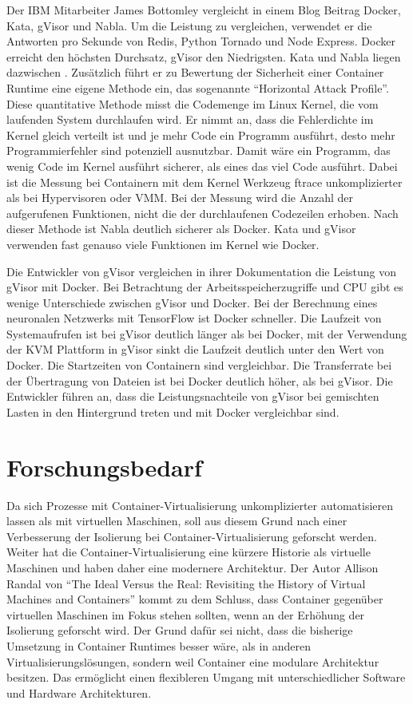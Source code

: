 Der IBM Mitarbeiter James Bottomley vergleicht in einem Blog Beitrag Docker, Kata, gVisor und Nabla. Um die Leistung zu vergleichen, verwendet er die Antworten pro Sekunde von Redis, Python Tornado und Node Express. Docker erreicht den höchsten Durchsatz, gVisor den Niedrigsten. Kata und Nabla liegen dazwischen \cite[vgl.][]{JamesBottomley.14.07.2018}.
Zusätzlich führt er zu Bewertung der Sicherheit einer Container Runtime eine eigene Methode ein, das sogenannte "`Horizontal Attack Profile"'. Diese quantitative Methode misst die Codemenge im Linux Kernel, die vom laufenden System durchlaufen wird. Er nimmt an, dass die Fehlerdichte im Kernel gleich verteilt ist und je mehr Code ein Programm ausführt, desto mehr Programmierfehler sind potenziell ausnutzbar. Damit wäre ein Programm, das wenig Code im Kernel ausführt sicherer, als eines das viel Code ausführt. Dabei ist die Messung bei Containern mit dem Kernel Werkzeug ftrace unkomplizierter als bei Hypervisoren oder \ac{VMM}. Bei der Messung wird die Anzahl der aufgerufenen Funktionen, nicht die der durchlaufenen Codezeilen erhoben.
Nach dieser Methode ist Nabla deutlich sicherer als Docker. Kata und gVisor verwenden fast genauso viele Funktionen im Kernel wie Docker. \cite[vgl.][]{JamesBottomley.14.07.2018, Luksa.2018}

Die Entwickler von gVisor vergleichen in ihrer Dokumentation die Leistung von gVisor mit Docker. Bei Betrachtung der Arbeitsspeicherzugriffe und CPU gibt es wenige Unterschiede zwischen gVisor und Docker. Bei der Berechnung eines neuronalen Netzwerks mit TensorFlow ist Docker schneller. Die Laufzeit von Systemaufrufen ist bei gVisor deutlich länger als bei Docker, mit der Verwendung der \ac{KVM} Plattform in gVisor sinkt die Laufzeit deutlich unter den Wert von Docker. Die Startzeiten von Containern sind vergleichbar. Die Transferrate bei der Übertragung von Dateien ist bei Docker deutlich höher, als bei gVisor. Die Entwickler führen an, dass die Leistungsnachteile von gVisor bei gemischten Lasten in den Hintergrund treten und mit Docker vergleichbar sind. \cite[vgl.][]{gVisor.20200122b}

\section{Forschungsbedarf}

Da sich Prozesse mit Container-Virtualisierung unkomplizierter automatisieren lassen als mit virtuellen Maschinen, soll aus diesem Grund nach einer Verbesserung der Isolierung bei Container-Virtualisierung geforscht werden. Weiter hat die Container-Virtualisierung eine kürzere Historie als virtuelle Maschinen und haben daher eine modernere Architektur. Der Autor Allison Randal von "`The Ideal Versus the Real: Revisiting the History of Virtual Machines  and Containers"' kommt zu dem Schluss, dass Container gegenüber virtuellen Maschinen im Fokus stehen sollten, wenn an der Erhöhung der Isolierung geforscht wird. Der Grund dafür sei nicht, dass die bisherige Umsetzung in Container Runtimes besser wäre, als in anderen Virtualisierungslösungen, sondern weil Container eine modulare Architektur besitzen. Das ermöglicht einen flexibleren Umgang mit unterschiedlicher Software und Hardware Architekturen.  \cite[vgl.][15]{Randal.28.04.2019}

